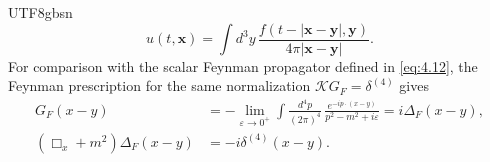 \documentclass[11pt,a4paper,oneside]{report}
\begin{document}
\begin{CJK*}{UTF8}{gbsn}
\begin{equation*}
{\displaystyle u(t,\mathbf x)=\int d^3y\,
\frac{f(t-|\mathbf x-\mathbf y|,\mathbf y)}{4\pi|\mathbf x-\mathbf y|}.}
\tag{B.59}\label{eq:B.59}
\end{equation*}
For comparison with the scalar Feynman propagator defined in \eqref{eq:4.12}, the Feynman prescription for the same normalization $\mathcal KG_F=\delta^{(4)}$ gives
\begin{equation*}
\begin{aligned}
G_F(x-y)&=-\lim_{\varepsilon\to0^+}\int\frac{d^4p}{(2\pi)^4}\,
\frac{e^{-ip\cdot(x-y)}}{p^2-m^2+i\varepsilon}
=i\Delta_F(x-y),\\
(\Box_x+m^2)\Delta_F(x-y)&=-i\delta^{(4)}(x-y).
\end{aligned}
\tag{B.60}\label{eq:B.60}
\end{equation*}

\clearpage
\end{CJK*}
\end{document}
